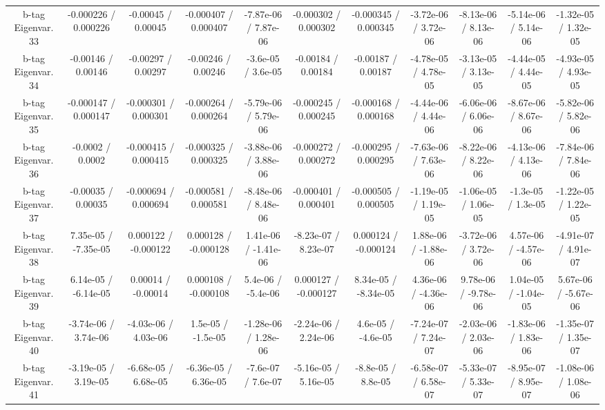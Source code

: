 \begin{table}[htbp]
\begin{center}
\begin{tabular}{|c|c|c|c|c|c|c|c|c|c|c|}
  b-tag Eigenvar. 33 & -0.000226 / 0.000226 & -0.00045 / 0.00045 & -0.000407 / 0.000407 & -7.87e-06 / 7.87e-06 & -0.000302 / 0.000302 & -0.000345 / 0.000345 & -3.72e-06 / 3.72e-06 & -8.13e-06 / 8.13e-06 & -5.14e-06 / 5.14e-06 & -1.32e-05 / 1.32e-05 \\ 
  b-tag Eigenvar. 34 & -0.00146 / 0.00146 & -0.00297 / 0.00297 & -0.00246 / 0.00246 & -3.6e-05 / 3.6e-05 & -0.00184 / 0.00184 & -0.00187 / 0.00187 & -4.78e-05 / 4.78e-05 & -3.13e-05 / 3.13e-05 & -4.44e-05 / 4.44e-05 & -4.93e-05 / 4.93e-05 \\ 
  b-tag Eigenvar. 35 & -0.000147 / 0.000147 & -0.000301 / 0.000301 & -0.000264 / 0.000264 & -5.79e-06 / 5.79e-06 & -0.000245 / 0.000245 & -0.000168 / 0.000168 & -4.44e-06 / 4.44e-06 & -6.06e-06 / 6.06e-06 & -8.67e-06 / 8.67e-06 & -5.82e-06 / 5.82e-06 \\ 
  b-tag Eigenvar. 36 & -0.0002 / 0.0002 & -0.000415 / 0.000415 & -0.000325 / 0.000325 & -3.88e-06 / 3.88e-06 & -0.000272 / 0.000272 & -0.000295 / 0.000295 & -7.63e-06 / 7.63e-06 & -8.22e-06 / 8.22e-06 & -4.13e-06 / 4.13e-06 & -7.84e-06 / 7.84e-06 \\ 
  b-tag Eigenvar. 37 & -0.00035 / 0.00035 & -0.000694 / 0.000694 & -0.000581 / 0.000581 & -8.48e-06 / 8.48e-06 & -0.000401 / 0.000401 & -0.000505 / 0.000505 & -1.19e-05 / 1.19e-05 & -1.06e-05 / 1.06e-05 & -1.3e-05 / 1.3e-05 & -1.22e-05 / 1.22e-05 \\ 
  b-tag Eigenvar. 38 & 7.35e-05 / -7.35e-05 & 0.000122 / -0.000122 & 0.000128 / -0.000128 & 1.41e-06 / -1.41e-06 & -8.23e-07 / 8.23e-07 & 0.000124 / -0.000124 & 1.88e-06 / -1.88e-06 & -3.72e-06 / 3.72e-06 & 4.57e-06 / -4.57e-06 & -4.91e-07 / 4.91e-07 \\ 
  b-tag Eigenvar. 39 & 6.14e-05 / -6.14e-05 & 0.00014 / -0.00014 & 0.000108 / -0.000108 & 5.4e-06 / -5.4e-06 & 0.000127 / -0.000127 & 8.34e-05 / -8.34e-05 & 4.36e-06 / -4.36e-06 & 9.78e-06 / -9.78e-06 & 1.04e-05 / -1.04e-05 & 5.67e-06 / -5.67e-06 \\ 
  b-tag Eigenvar. 40 & -3.74e-06 / 3.74e-06 & -4.03e-06 / 4.03e-06 & 1.5e-05 / -1.5e-05 & -1.28e-06 / 1.28e-06 & -2.24e-06 / 2.24e-06 & 4.6e-05 / -4.6e-05 & -7.24e-07 / 7.24e-07 & -2.03e-06 / 2.03e-06 & -1.83e-06 / 1.83e-06 & -1.35e-07 / 1.35e-07 \\ 
  b-tag Eigenvar. 41 & -3.19e-05 / 3.19e-05 & -6.68e-05 / 6.68e-05 & -6.36e-05 / 6.36e-05 & -7.6e-07 / 7.6e-07 & -5.16e-05 / 5.16e-05 & -8.8e-05 / 8.8e-05 & -6.58e-07 / 6.58e-07 & -5.33e-07 / 5.33e-07 & -8.95e-07 / 8.95e-07 & -1.08e-06 / 1.08e-06 \\ 

\end{tabular}
\end{center}
\end{table}
